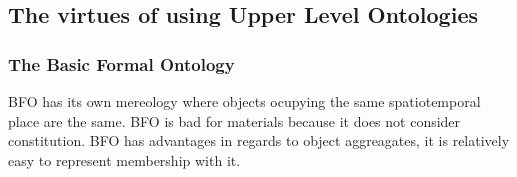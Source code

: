 \subsection{The virtues of using Upper Level Ontologies}
\label{upperlevel}


\subsubsection{The Basic Formal Ontology}

BFO has its own mereology where objects ocupying the same spatiotemporal place
are the same. BFO is bad for materials because it does not consider constitution.
BFO has advantages in regards to object aggreagates, it is relatively easy to represent
membership with it. 
